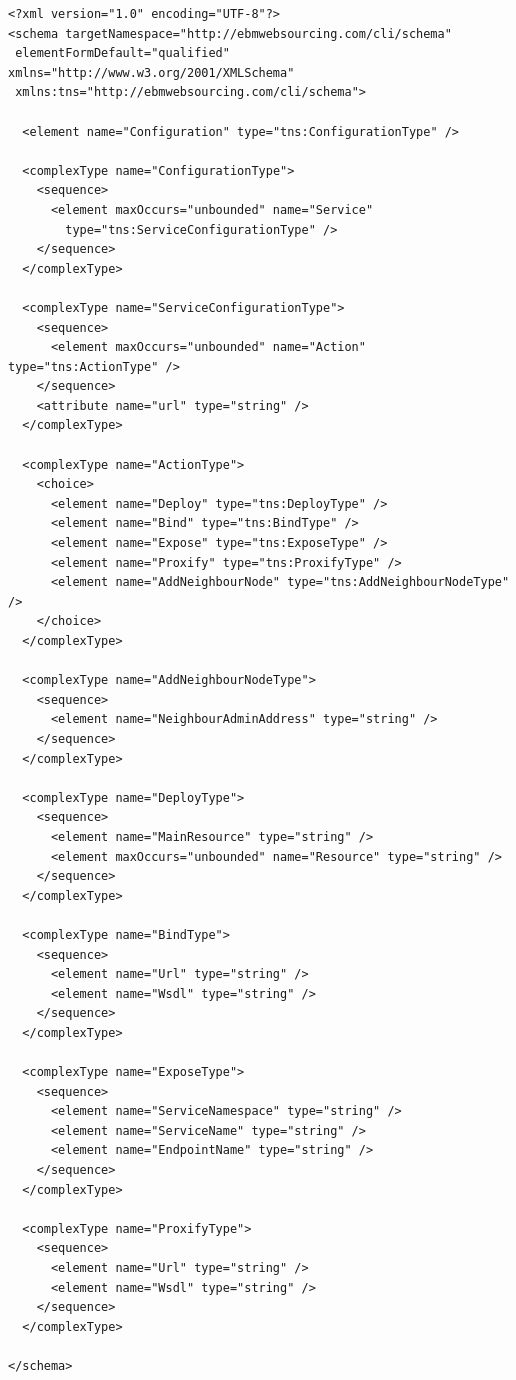 \documentclass[a4paper, 10pt]{article}
\begin{document}
{\footnotesize
\begin{lstlisting}[caption=\texttt{config.xml} schema, label=lst:config_xml_schema]
<?xml version="1.0" encoding="UTF-8"?>
<schema targetNamespace="http://ebmwebsourcing.com/cli/schema"
 elementFormDefault="qualified" xmlns="http://www.w3.org/2001/XMLSchema"
 xmlns:tns="http://ebmwebsourcing.com/cli/schema">

  <element name="Configuration" type="tns:ConfigurationType" />

  <complexType name="ConfigurationType">
    <sequence>
      <element maxOccurs="unbounded" name="Service"
        type="tns:ServiceConfigurationType" />
    </sequence>
  </complexType>

  <complexType name="ServiceConfigurationType">
    <sequence>
      <element maxOccurs="unbounded" name="Action" type="tns:ActionType" />
    </sequence>
    <attribute name="url" type="string" />
  </complexType>

  <complexType name="ActionType">
    <choice>
      <element name="Deploy" type="tns:DeployType" />
      <element name="Bind" type="tns:BindType" />
      <element name="Expose" type="tns:ExposeType" />
      <element name="Proxify" type="tns:ProxifyType" />
      <element name="AddNeighbourNode" type="tns:AddNeighbourNodeType" />
    </choice>
  </complexType>

  <complexType name="AddNeighbourNodeType">
    <sequence>
      <element name="NeighbourAdminAddress" type="string" />
    </sequence>
  </complexType>

  <complexType name="DeployType">
    <sequence>
      <element name="MainResource" type="string" />
      <element maxOccurs="unbounded" name="Resource" type="string" />
    </sequence>
  </complexType>

  <complexType name="BindType">
    <sequence>
      <element name="Url" type="string" />
      <element name="Wsdl" type="string" />
    </sequence>
  </complexType>

  <complexType name="ExposeType">
    <sequence>
      <element name="ServiceNamespace" type="string" />
      <element name="ServiceName" type="string" />
      <element name="EndpointName" type="string" />
    </sequence>
  </complexType>

  <complexType name="ProxifyType">
    <sequence>
      <element name="Url" type="string" />
      <element name="Wsdl" type="string" />
    </sequence>
  </complexType>

</schema>
\end{lstlisting}
}
\end{document}
